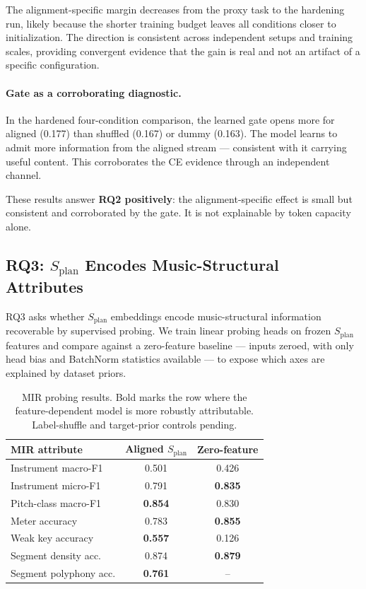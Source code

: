 \documentclass[11pt]{article}
\newcommand{\splan}{$S_{\mathrm{plan}}$}
\begin{document}
The alignment-specific margin decreases from the proxy task to the hardening run, likely
because the shorter training budget leaves all conditions closer to initialization.
The direction is consistent across independent setups and training scales, providing
convergent evidence that the gain is real and not an artifact of a specific configuration.

\paragraph{Gate as a corroborating diagnostic.}
In the hardened four-condition comparison, the learned gate opens more for aligned
(0.177) than shuffled (0.167) or dummy (0.163).  The model learns to admit more
information from the aligned stream --- consistent with it carrying useful content.
This corroborates the CE evidence through an independent channel.

These results answer \textbf{RQ2 positively}: the alignment-specific effect is small
but consistent and corroborated by the gate.  It is not explainable by token capacity alone.

\subsection{RQ3: \splan{} Encodes Music-Structural Attributes}
\label{sec:rq3}

RQ3 asks whether \splan{} embeddings encode music-structural information recoverable by
supervised probing.  We train linear probing heads on frozen \splan{} features and
compare against a zero-feature baseline --- inputs zeroed, with only head bias and
BatchNorm statistics available --- to expose which axes are explained by dataset priors.

\begin{table}[h]
\centering
\small
\begin{tabular}{lcc}
\toprule
MIR attribute & Aligned \splan{} & Zero-feature \\
\midrule
Instrument macro-F1    & 0.501 & 0.426 \\
Instrument micro-F1    & 0.791 & \textbf{0.835} \\
Pitch-class macro-F1   & \textbf{0.854} & 0.830 \\
Meter accuracy         & 0.783 & \textbf{0.855} \\
Weak key accuracy      & \textbf{0.557} & 0.126 \\
Segment density acc.   & 0.874 & \textbf{0.879} \\
Segment polyphony acc. & \textbf{0.761} & -- \\
\bottomrule
\end{tabular}
\caption{MIR probing results.  Bold marks the row where the feature-dependent model
  is more robustly attributable.  Label-shuffle and target-prior controls pending.}
\label{tab:probing}
\end{table}
\end{document}
